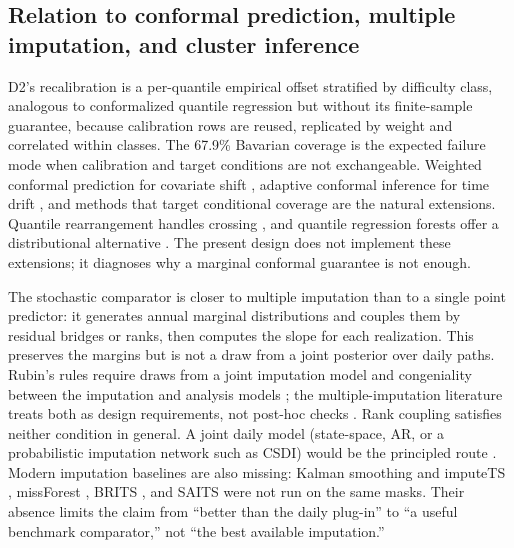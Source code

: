 \subsection{Relation to conformal prediction, multiple imputation, and cluster inference}

D2's recalibration is a per-quantile empirical offset stratified by difficulty class, analogous to conformalized quantile regression \citep{romano2019} but without its finite-sample guarantee, because calibration rows are reused, replicated by weight and correlated within classes. The 67.9\% Bavarian coverage is the expected failure mode when calibration and target conditions are not exchangeable. Weighted conformal prediction for covariate shift \citep{tibshirani2019}, adaptive conformal inference for time drift \citep{gibbs2021}, and methods that target conditional coverage \citep{gibbs2023} are the natural extensions. Quantile rearrangement handles crossing \citep{chernozhukov2010}, and quantile regression forests offer a distributional alternative \citep{meinshausen2006}. The present design does not implement these extensions; it diagnoses why a marginal conformal guarantee is not enough.

The stochastic comparator is closer to multiple imputation than to a single point predictor: it generates annual marginal distributions and couples them by residual bridges or ranks, then computes the slope for each realization. This preserves the margins but is not a draw from a joint posterior over daily paths. Rubin's rules require draws from a joint imputation model and congeniality between the imputation and analysis models \citep{rubin1987,little2019,meng1994}; the multiple-imputation literature treats both as design requirements, not post-hoc checks \citep{vanbuuren2018}. Rank coupling satisfies neither condition in general. A joint daily model (state-space, AR, or a probabilistic imputation network such as CSDI) would be the principled route \citep{tashiro2021}. Modern imputation baselines are also missing: Kalman smoothing and imputeTS \citep{moritz2017}, missForest \citep{stekhoven2012}, BRITS \citep{cao2018}, and SAITS \citep{du2023} were not run on the same masks. Their absence limits the claim from ``better than the daily plug-in'' to ``a useful benchmark comparator,'' not ``the best available imputation.''

